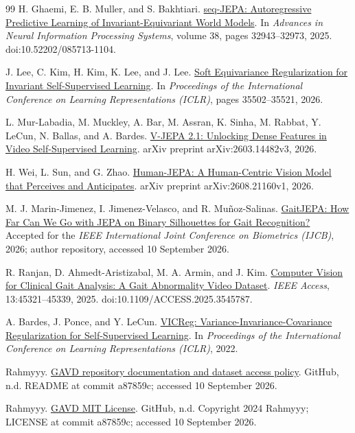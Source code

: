 \documentclass{article}
\begin{document}
{\begin{thebibliography}{99}
 H. Ghaemi, E. B. Muller, and S. Bakhtiari. \href{https://proceedings.neurips.cc/paper_files/paper/2025/hash/2f63d2963526bdd9ff1b8bcc2dc9905a-Abstract-Conference.html}{seq-JEPA: Autoregressive Predictive Learning of Invariant-Equivariant World Models}. In \emph{Advances in Neural Information Processing Systems}, volume 38, pages 32943--32973, 2025. doi:10.52202/085713-1104.

 J. Lee, C. Kim, H. Kim, K. Lee, and J. Lee. \href{https://proceedings.iclr.cc/paper_files/paper/2026/hash/3be6511c8f56d0dca4b5ed59fdf9b2f4-Abstract-Conference.html}{Soft Equivariance Regularization for Invariant Self-Supervised Learning}. In \emph{Proceedings of the International Conference on Learning Representations (ICLR)}, pages 35502--35521, 2026.

 L. Mur-Labadia, M. Muckley, A. Bar, M. Assran, K. Sinha, M. Rabbat, Y. LeCun, N. Ballas, and A. Bardes. \href{https://arxiv.org/abs/2603.14482}{V-JEPA 2.1: Unlocking Dense Features in Video Self-Supervised Learning}. arXiv preprint arXiv:2603.14482v3, 2026.

 H. Wei, L. Sun, and G. Zhao. \href{https://arxiv.org/abs/2608.21160}{Human-JEPA: A Human-Centric Vision Model that Perceives and Anticipates}. arXiv preprint arXiv:2608.21160v1, 2026.

 M. J. Marin-Jimenez, I. Jimenez-Velasco, and R. Muñoz-Salinas. \href{https://github.com/AVAuco/GaitJEPA}{GaitJEPA: How Far Can We Go with JEPA on Binary Silhouettes for Gait Recognition?} Accepted for the \emph{IEEE International Joint Conference on Biometrics (IJCB)}, 2026; author repository, accessed 10 September 2026.

 R. Ranjan, D. Ahmedt-Aristizabal, M. A. Armin, and J. Kim. \href{https://arxiv.org/abs/2407.04190}{Computer Vision for Clinical Gait Analysis: A Gait Abnormality Video Dataset}. \emph{IEEE Access}, 13:45321--45339, 2025. doi:10.1109/ACCESS.2025.3545787.

 A. Bardes, J. Ponce, and Y. LeCun. \href{https://arxiv.org/abs/2105.04906}{VICReg: Variance-Invariance-Covariance Regularization for Self-Supervised Learning}. In \emph{Proceedings of the International Conference on Learning Representations (ICLR)}, 2022.

 Rahmyyy. \href{https://github.com/Rahmyyy/GAVD/blob/a87859c881603443f200bcd640663d2c3d7a8136/README.md}{GAVD repository documentation and dataset access policy}. GitHub, n.d. README at commit a87859c; accessed 10 September 2026.

 Rahmyyy. \href{https://github.com/Rahmyyy/GAVD/blob/a87859c881603443f200bcd640663d2c3d7a8136/LICENSE}{GAVD MIT License}. GitHub, n.d. Copyright 2024 Rahmyyy; LICENSE at commit a87859c; accessed 10 September 2026.
\end{thebibliography}
}
\clearpage
\appendix
\label{physworld:appendix-start}
\end{document}
